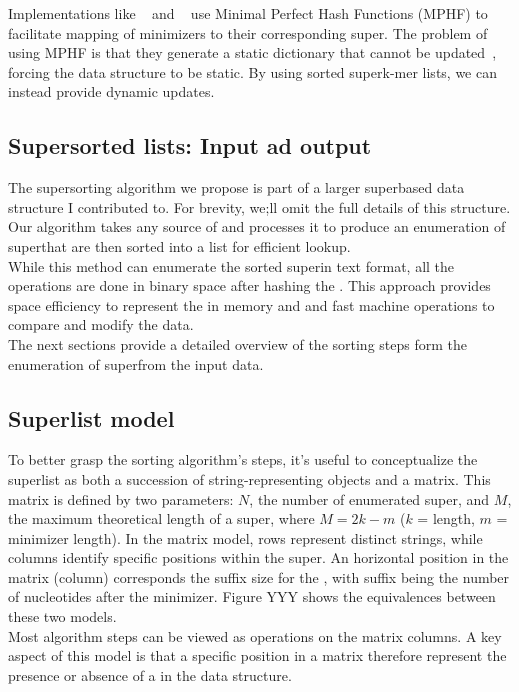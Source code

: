 Implementations like \blight~\cite{blight} and \ssh~\cite{sshash} use Minimal Perfect Hash Functions (MPHF) to facilitate mapping of minimizers to their corresponding super\kmers. The problem of using MPHF is that they generate a static dictionary that cannot be updated~\cite{smsketch}, forcing the data structure to be static. By using sorted superk-mer lists, we can instead provide dynamic updates.

\subsection{Super\kmer sorted lists: Input ad output}
The super\kmer sorting algorithm we propose is part of a larger super\kmer based data structure I contributed to. For brevity, we;ll omit the full details of this structure. \\
Our algorithm takes any source of \kmers and processes it to produce an enumeration of super\kmers that are then sorted into a list for efficient lookup.\\
While this method can enumerate the sorted super\kmers in text format, all the operations are done in binary space after hashing the \kmers. This approach provides space efficiency to represent the \kmers in memory and and fast machine operations to compare and modify the data.\\
The next sections provide a detailed overview of the sorting steps form the enumeration of super\kmer from the input data.

\subsection{Super\kmer list model}
To better grasp the sorting algorithm's steps, it's useful to conceptualize the super\kmer list as both a succession of string-representing objects and a matrix. This matrix is defined by two parameters: $N$, the number of enumerated super\kmers, and $M$, the maximum theoretical length of a super\kmer, where $M = 2k - m$ ($k$ = \kmer length, $m$ = minimizer length). In the matrix model, rows represent distinct strings, while columns identify specific positions within the super\kmer. An horizontal position in the matrix (column) corresponds the suffix size for the \kmer, with suffix being the number of nucleotides after the minimizer. Figure YYY shows the equivalences between these two models.\\
Most algorithm steps can be viewed as operations on the matrix columns. A key aspect of this model is that a specific position in a matrix therefore represent the presence or absence of a \kmer in the data structure.

